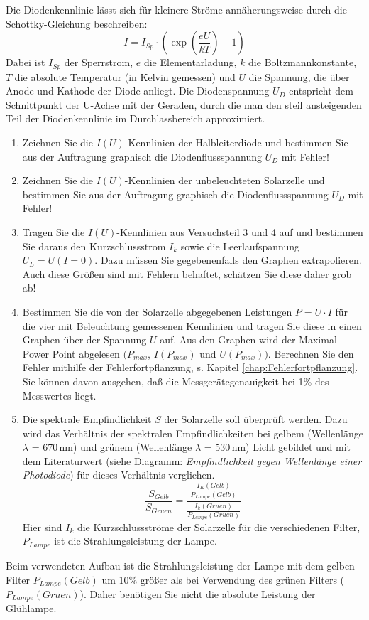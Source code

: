 
Die Diodenkennlinie lässt sich für kleinere Ströme annäherungsweise durch die Schottky-Gleichung beschreiben:
\begin{equation}
I = I_{Sp}\cdot\left(\exp\left(\frac{eU}{kT}\right)-1\right)
\end{equation}
Dabei ist $I_{Sp}$ der Sperrstrom, $e$ die Elementarladung, $k$ die Boltzmannkonstante, $T$ die absolute Temperatur (in Kelvin gemessen) und $U$ die Spannung, die über Anode und Kathode der Diode anliegt. Die Diodenspannung $U_D$ entspricht dem Schnittpunkt der U-Achse mit der Geraden, durch die man den steil ansteigenden Teil der Diodenkennlinie im Durchlassbereich approximiert.

\begin{enumerate}
	\item Zeichnen Sie die $I(U)$-Kennlinien der Halbleiterdiode und bestimmen Sie aus der Auftragung graphisch die Diodenflussspannung $U_D$ mit Fehler!
	\item Zeichnen Sie die $I(U)$-Kennlinien der unbeleuchteten Solarzelle und bestimmen Sie aus der Auftragung graphisch die Diodenflussspannung $U_D$ mit Fehler!
	\item Tragen Sie die $I(U)$-Kennlinien aus Versuchsteil 3 und 4 auf und bestimmen Sie daraus den Kurzschlussstrom $I_k$ sowie die Leerlaufspannung $U_L = U (I = 0)$. Dazu müssen Sie gegebenenfalls den Graphen extrapolieren. 	
		Auch diese Größen sind mit Fehlern behaftet, schätzen Sie diese daher grob ab!
	\item Bestimmen Sie die von der Solarzelle abgegebenen Leistungen $P = U \cdot I$ für die vier mit Beleuchtung gemessenen Kennlinien und tragen Sie diese in einen Graphen über der Spannung $U$ auf. Aus den Graphen wird der Maximal Power Point abgelesen $(P_{max}$, $I(P_{max})$ und $U(P_{max}))$. Berechnen Sie den Fehler mithilfe der Fehlerfortpflanzung, s. Kapitel \ref{chap:Fehlerfortpflanzung}. Sie können davon ausgehen, daß die Messgerätegenauigkeit bei 1\% des Messwertes liegt.
	\item Die spektrale Empfindlichkeit $S$ der Solarzelle soll überprüft werden. Dazu wird das Verhältnis der spektralen Empfindlichkeiten bei gelbem (Wellenlänge $\lambda$ = 670\,nm) und grünem (Wellenlänge $\lambda$ = 530\,nm)
		Licht gebildet und mit dem Literaturwert (siehe Diagramm: \textit{Empfindlichkeit gegen Wellenlänge einer Photodiode}) für dieses Verhältnis verglichen.
		\begin{equation}
			\frac{S_{Gelb}}{S_{Gruen}}=\frac{\frac{I_K(Gelb)}{P_{Lampe}(Gelb)}}{\frac{I_k(Gruen)}{P_{Lampe}(Gruen)}}
		\end{equation}
		Hier sind $I_k$ die Kurzschlussströme der Solarzelle für die verschiedenen Filter, $P_{Lampe}$ ist die Strahlungsleistung der Lampe.
\end{enumerate}
Beim verwendeten Aufbau ist die Strahlungsleistung der Lampe mit dem gelben Filter $P_{Lampe}(Gelb)$ um 10\% größer als bei Verwendung des grünen Filters ($P_{Lampe}(Gruen)$). Daher benötigen Sie nicht die absolute Leistung der Glühlampe.

